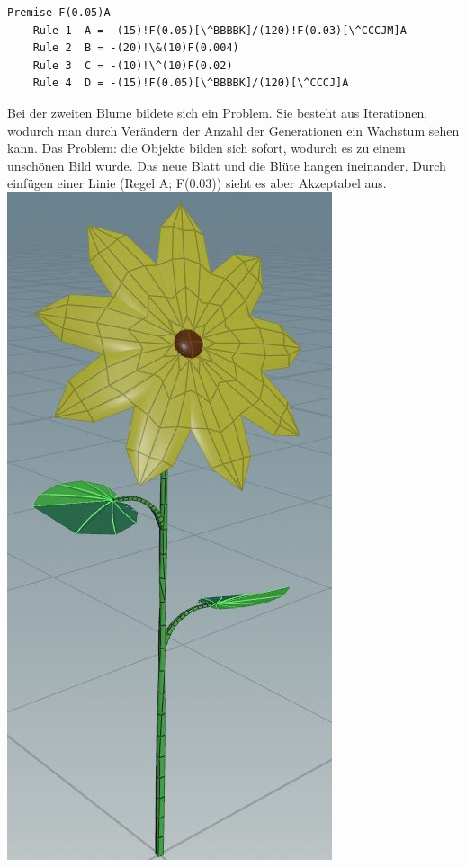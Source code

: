 \begin{​itemize}
\begin{lstlisting}[caption={Flower Two}]
	Premise F(0.05)A
	Rule 1	A = -(15)!F(0.05)[\^BBBBK]/(120)!F(0.03)[\^CCCJM]A
	Rule 2	B = -(20)!\&(10)F(0.004)
	Rule 3	C = -(10)!\^(10)F(0.02)
	Rule 4	D = -(15)!F(0.05)[\^BBBBK]/(120)[\^CCCJ]A
\end{lstlisting} 
Bei der zweiten Blume bildete sich ein Problem. Sie besteht aus Iterationen, wodurch man durch Verändern der Anzahl der Generationen ein Wachstum sehen kann. Das Problem: die Objekte bilden sich sofort, wodurch es zu einem unschönen Bild wurde. Das neue Blatt und die Blüte hangen ineinander. Durch einfügen einer Linie (Regel A; F(0.03)) sieht es aber Akzeptabel aus. 
\includegraphics*[width=\textwidth]{graphics/flowerthree1.JPG}

\end{​itemize}
